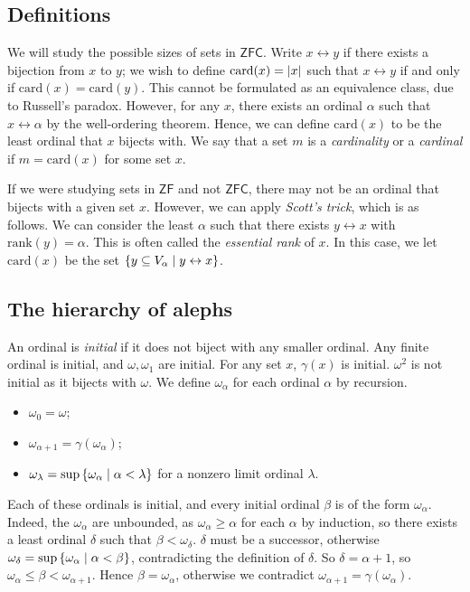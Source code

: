 \subsection{Definitions}
We will study the possible sizes of sets in \( \mathsf{ZFC} \).
Write \( x \leftrightarrow y \) if there exists a bijection from \( x \) to \( y \); we wish to define \( \mathrm{card}(x) = \abs{x} \) such that \( x \leftrightarrow y \) if and only if \( \mathrm{card}(x) = \mathrm{card}(y) \).
This cannot be formulated as an equivalence class, due to Russell's paradox.
However, for any \( x \), there exists an ordinal \( \alpha \) such that \( x \leftrightarrow \alpha \) by the well-ordering theorem.
Hence, we can define \( \mathrm{card}(x) \) to be the least ordinal that \( x \) bijects with.
We say that a set \( m \) is a \emph{cardinality} or a \emph{cardinal} if \( m = \mathrm{card}(x) \) for some set \( x \).

If we were studying sets in \( \mathsf{ZF} \) and not \( \mathsf{ZFC} \), there may not be an ordinal that bijects with a given set \( x \).
However, we can apply \emph{Scott's trick}, which is as follows.
We can consider the least \( \alpha \) such that there exists \( y \leftrightarrow x \) with \( \mathrm{rank}(y) = \alpha \).
This is often called the \emph{essential rank} of \( x \).
In this case, we let \( \mathrm{card}(x) \) be the set \( \qty{y \subseteq V_\alpha \mid y \leftrightarrow x} \).

\subsection{The hierarchy of alephs}
An ordinal is \emph{initial} if it does not biject with any smaller ordinal.
Any finite ordinal is initial, and \( \omega, \omega_1 \) are initial.
For any set \( x \), \( \gamma(x) \) is initial.
\( \omega^2 \) is not initial as it bijects with \( \omega \).
We define \( \omega_\alpha \) for each ordinal \( \alpha \) by recursion.
\begin{itemize}
    \item \( \omega_0 = \omega \);
    \item \( \omega_{\alpha + 1} = \gamma(\omega_\alpha) \);
    \item \( \omega_\lambda = \sup\qty{\omega_\alpha \mid \alpha < \lambda} \) for a nonzero limit ordinal \( \lambda \).
\end{itemize}
Each of these ordinals is initial, and every initial ordinal \( \beta \) is of the form \( \omega_\alpha \).
Indeed, the \( \omega_\alpha \) are unbounded, as \( \omega_\alpha \geq \alpha \) for each \( \alpha \) by induction, so there exists a least ordinal \( \delta \) such that \( \beta < \omega_\delta \).
\( \delta \) must be a successor, otherwise \( \omega_\delta = \sup\qty{\omega_\alpha \mid \alpha < \beta} \), contradicting the definition of \( \delta \).
So \( \delta = \alpha + 1 \), so \( \omega_\alpha \leq \beta < \omega_{\alpha+1} \).
Hence \( \beta = \omega_\alpha \), otherwise we contradict \( \omega_{\alpha+1} = \gamma(\omega_\alpha) \).


